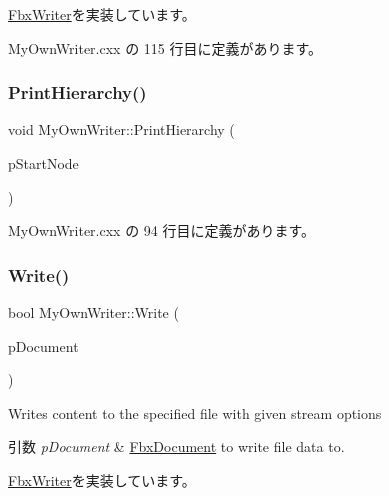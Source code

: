 \hyperlink{class_fbx_writer_a0fd62ec785e7108924975591ee8fbf30}{Fbx\+Writer}を実装しています。



 My\+Own\+Writer.\+cxx の 115 行目に定義があります。

\mbox{\label{class_my_own_writer_aca6af34bd7fb17cfc4ed5e87453c3960}} 
\subsubsection{\texorpdfstring{Print\+Hierarchy()}{PrintHierarchy()}}
{\footnotesize\ttfamily void My\+Own\+Writer\+::\+Print\+Hierarchy (\begin{DoxyParamCaption}\item[{\hyperlink{class_fbx_node}{Fbx\+Node} $\ast$}]{p\+Start\+Node }\end{DoxyParamCaption})\hspace{0.3cm}{\ttfamily [virtual]}}



 My\+Own\+Writer.\+cxx の 94 行目に定義があります。

\mbox{\label{class_my_own_writer_a7ec7a323efec7306c17198a469667d1e}} 
\subsubsection{\texorpdfstring{Write()}{Write()}}
{\footnotesize\ttfamily bool My\+Own\+Writer\+::\+Write (\begin{DoxyParamCaption}\item[{\hyperlink{class_fbx_document}{Fbx\+Document} $\ast$}]{p\+Document }\end{DoxyParamCaption})\hspace{0.3cm}{\ttfamily [virtual]}}

Writes content to the specified file with given stream options 
\begin{DoxyParams}{引数}
{\em p\+Document} & \hyperlink{class_fbx_document}{Fbx\+Document} to write file data to. \\
\hline
\end{DoxyParams}


\hyperlink{class_fbx_writer_aa8c0277611da0fdb0b9a184c55c30c2c}{Fbx\+Writer}を実装しています。



